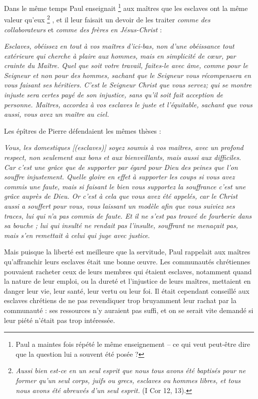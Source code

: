  Dans le même temps Paul enseignait%
\footnote{Paul a maintes fois répété le même enseignement -- ce qui veut peut-être dire que la question lui a souvent été posée ?} 
aux maîtres que les esclaves ont la même valeur qu'eux%
\footnote{\emph{Aussi bien est-ce en un seul esprit que nous tous avons été baptisés pour ne former qu'un seul corps, juifs ou grecs, esclaves ou hommes libres, et tous nous avons été abreuvés d'un seul esprit.} (I Cor 12, 13).}%
, et il leur faisait un devoir de les traiter \emph{comme des collaborateurs} et \emph{comme des frères en Jésus-Christ} :

\begin{displayquote}[Col 3, 22-25 ; 4,1]
\emph{Esclaves, obéissez en tout à vos maîtres d'ici-bas, non d'une obéissance tout extérieure qui cherche à plaire aux hommes, mais en simplicité de cœur, par crainte du Maître. Quel que soit votre travail, faites-le avec âme, comme pour le Seigneur et non pour des hommes, sachant que le Seigneur vous récompensera en vous faisant ses héritiers. C'est le Seigneur Christ que vous servez; qui se montre injuste sera certes payé de son injustice, sans qu'il soit fait acception de personne. Maîtres, accordez à vos esclaves le juste et l'équitable, sachant que vous aussi, vous avez un maître au ciel.}
\end{displayquote}

 Les épîtres de Pierre défendaient les mêmes thèses :

\begin{displayquote}
\emph{Vous, les domestiques \emph{[(esclaves)]} soyez soumis à vos maîtres, avec un profond respect, non seulement aux bons et aux bienveillants, mais aussi aux difficiles. Car c'est une grâce que de supporter par égard pour Dieu des peines que l'on souffre injustement. Quelle gloire en effet à supporter les coups si vous avez commis une faute, mais si faisant le bien vous supportez la souffrance c'est une grâce auprès de Dieu. Or c'est à cela que vous avez été appelés, car le Christ aussi a souffert pour vous, vous laissant un modèle afin que vous suiviez ses traces, lui qui n'a pas commis de faute. Et il ne s'est pas trouvé de fourberie dans sa bouche ; lui qui insulté ne rendait pas l'insulte, souffrant ne menaçait pas, mais s'en remettait à celui qui juge avec justice}.
\end{displayquote}

 Mais puisque la liberté est meilleure que la servitude, Paul rappelait aux maîtres qu'affranchir leurs esclaves était une bonne œuvre. Les communautés chrétiennes pouvaient racheter ceux de leurs membres qui étaient esclaves, notamment quand la nature de leur emploi, ou la dureté et l'injustice de leurs maîtres, mettaient en danger leur vie, leur santé, leur vertu ou leur foi. Il était cependant conseillé aux esclaves chrétiens de ne pas revendiquer trop bruyamment leur rachat par la communauté : ses ressources n'y auraient pas suffi, et on se serait vite demandé si leur piété n'était pas trop intéressée.

